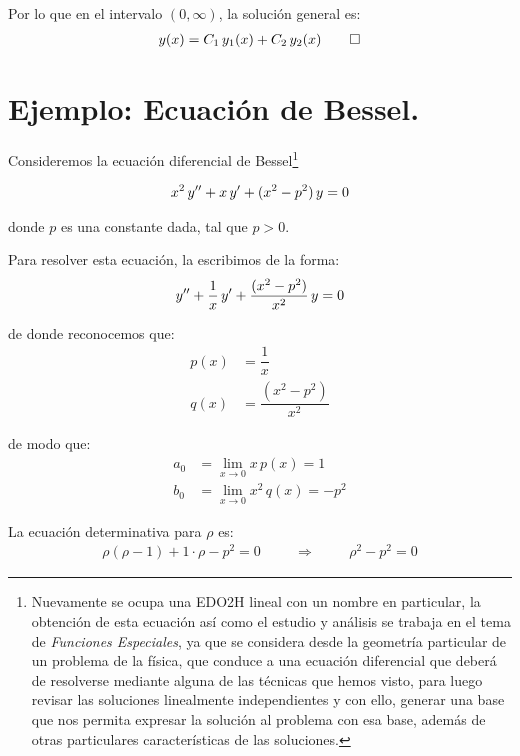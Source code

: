 Por lo que en el intervalo $(0, \infty)$, la solución general es:
\begin{align*}
y(x) = C_{1} \, y_{1} (x) + C_{2} \, y_{2}(x) \qed
\end{align*}

\section{Ejemplo: Ecuación de Bessel.}

Consideremos la ecuación diferencial de Bessel\footnote{Nuevamente se ocupa una EDO2H lineal con un nombre en particular, la obtención de esta ecuación así como el estudio y análisis se trabaja en el tema de \emph{Funciones Especiales}, ya que se considera desde la geometría particular de un problema de la física, que conduce a una ecuación diferencial que deberá de resolverse mediante alguna de las técnicas que hemos visto, para luego revisar las soluciones linealmente independientes y con ello, generar una base que nos permita expresar la solución al problema con esa base, además de otras particulares características de las soluciones.}

\begin{align}
x^{2} \, {y}^{\prime \prime} + x \, {y}^{\prime} + (x^{2} - p^{2}) \, y = 0
\label{eq:ecuacion_17_E2_01}
\end{align}

donde $p$ es una constante dada, tal que $p > 0$.
\par
Para resolver esta ecuación, la escribimos de la forma:
\begin{align}
{y}^{\prime \prime} + \dfrac{1}{x} \, {y}^{\prime} + \dfrac{(x^{2} - p^{2})}{x^{2}} \, y = 0
\label{eq:ecuacion_17_E2_02}    
\end{align}

de donde reconocemos que:
\begin{align*}
p(x) &= \dfrac{1}{x} \\[1em]
q(x) &= \dfrac{(x^{2} - p^{2})}{x^{2}}
\end{align*}

de modo que:
\begin{align*}
a_{0} &= \lim_{x \to 0} x \, p(x) =  1 \\[1em]
b_{0} &= \lim_{x \to 0} x^{2} \, q(x) =  -p^{2}
\end{align*}

La ecuación determinativa para $\rho$ es:
\begin{align}
\rho (\rho - 1) + 1 \cdot \rho - p^{2} = 0 \hspace{1cm} \Rightarrow \hspace{1cm} \rho^{2} - p^{2} = 0
\label{eq:ecuacion_17_E2_03}
\end{align}

